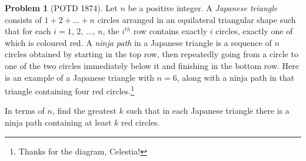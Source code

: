 \documentclass[11pt]{article} %
\theoremstyle{definition}
\newtheorem{problem}{Problem}
\theoremstyle{remark}
\begin{document}
\begin{problem}[POTD 1874]
    Let \(n\) be a positive integer. A \textit{Japanese triangle} consists of \(1 + 2 + \dots + n\) circles arranged in an equilateral triangular shape such that for each \(i = 1\), \(2\), \(\dots\), \(n\), the \(i^{th}\) row contains exactly \(i\) circles, exactly one of which is coloured red. A \textit{ninja path} in a Japanese triangle is a sequence of \(n\) circles obtained by starting in the top row, then repeatedly going from a circle to one of the two circles immediately below it and finishing in the bottom row. Here is an example of a Japanese triangle with \(n = 6\), along with a ninja path in that triangle containing four red circles.\footnote{Thanks for the diagram, Celestia!}

    \begin{center}
    \end{center}

    In terms of \(n\), find the greatest \(k\) such that in each Japanese triangle there is a ninja path containing at least \(k\) red circles.
\end{problem}
\end{document}
